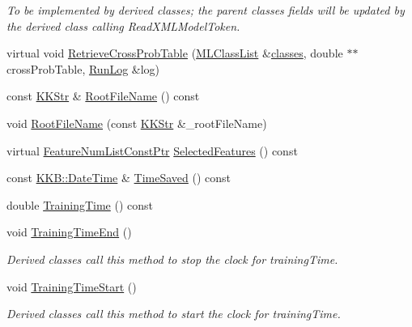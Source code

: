 \begin{DoxyCompactItemize}
\begin{DoxyCompactList}\small\item\em To be implemented by derived classes; the parent classes fields will be updated by the derived class calling Read\+X\+M\+L\+Model\+Token. \end{DoxyCompactList}\item 
virtual void \hyperlink{class_k_k_m_l_l_1_1_model_a9e809d2562e49ab6842344442be94362}{Retrieve\+Cross\+Prob\+Table} (\hyperlink{class_k_k_m_l_l_1_1_m_l_class_list}{M\+L\+Class\+List} \&\hyperlink{class_k_k_m_l_l_1_1_model_a764e7680f07814c3c5313dc4e4de60a1}{classes}, double $\ast$$\ast$cross\+Prob\+Table, \hyperlink{class_k_k_b_1_1_run_log}{Run\+Log} \&log)
\item 
const \hyperlink{class_k_k_b_1_1_k_k_str}{K\+K\+Str} \& \hyperlink{class_k_k_m_l_l_1_1_model_a3faeb81c318726382235fcc980526dde}{Root\+File\+Name} () const 
\item 
void \hyperlink{class_k_k_m_l_l_1_1_model_a45bf6aeb48c2f37a82fa674248988d63}{Root\+File\+Name} (const \hyperlink{class_k_k_b_1_1_k_k_str}{K\+K\+Str} \&\+\_\+root\+File\+Name)
\item 
virtual \hyperlink{namespace_k_k_m_l_l_a81284b0a14973267260023f9a72da94a}{Feature\+Num\+List\+Const\+Ptr} \hyperlink{class_k_k_m_l_l_1_1_model_a010299919b5c5d4b60dfb13d12562024}{Selected\+Features} () const 
\item 
const \hyperlink{class_k_k_b_1_1_date_time}{K\+K\+B\+::\+Date\+Time} \& \hyperlink{class_k_k_m_l_l_1_1_model_a78331deddc9c01c75efb393b4f3541da}{Time\+Saved} () const 
\item 
double \hyperlink{class_k_k_m_l_l_1_1_model_a67b3aa11699cd6b26d7278a3b8478f5a}{Training\+Time} () const 
\item 
void \hyperlink{class_k_k_m_l_l_1_1_model_a95ac8514000249fe8968b0b4e00a9342}{Training\+Time\+End} ()
\begin{DoxyCompactList}\small\item\em Derived classes call this method to stop the clock for \textquotesingle{}training\+Time\textquotesingle{}. \end{DoxyCompactList}\item 
void \hyperlink{class_k_k_m_l_l_1_1_model_a8afe69ddf54a60b75ae540bcf9d4c901}{Training\+Time\+Start} ()
\begin{DoxyCompactList}\small\item\em Derived classes call this method to start the clock for \textquotesingle{}training\+Time\textquotesingle{}. \end{DoxyCompactList}\item 
$$
\end{DoxyCompactItemize}
